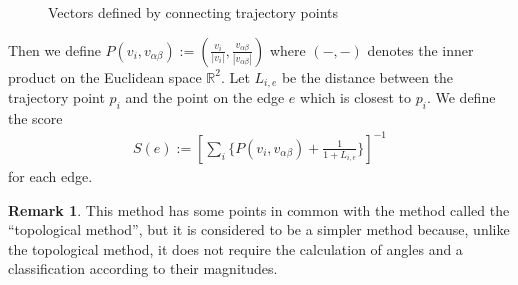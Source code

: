 \documentclass{article}
\numberwithin{equation}{section}
\theoremstyle{definition}
\newtheorem{remark}[remark]{Remark}
\def\red(#1){\textcolor{red}{#1}}
\begin{document}
\begin{figure}[H]
\begin{center}
\caption{Vectors defined by connecting trajectory points} \label{inner-product}
\end{center}
\end{figure} 

Then we define $P(v_{i}, v_{\alpha\beta}) := \left(\frac{v_{i}}{|v_{i}|}, \frac{v_{\alpha\beta}}{|v_{\alpha\beta}|}\right)$ where $(-,-)$ denotes the inner product on the Euclidean space $\mathbb{R}^2$.
Let $L_{i,e}$ be the distance between the trajectory point $p_{i}$ and the point on the edge $e$ which is closest to $p_{i}$.
We define the score
\begin{align*}
    S(e) := \left[\sum_{i}\biggl\{P(v_{i}, v_{\alpha\beta}) + \frac{1}{1+L_{i,e}}\biggr\}\right]^{-1}    
\end{align*}
for each edge.

\begin{remark}
This method has some points in common with the method called the ``topological method''\cite{QOZN}, but it is considered to be a simpler method because, unlike the topological method, it does not require the calculation of angles and a classification according to their magnitudes.
\end{remark}
\end{document}

